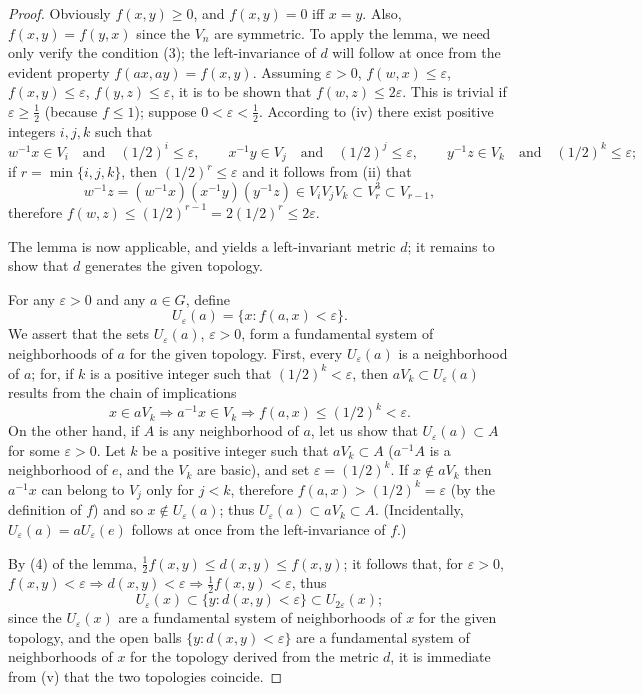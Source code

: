 \begin{proof}
    Obviously $f(x,y) \ge 0$, and $f(x,y) = 0$ iff $x = y$. Also, $f(x,y) = f(y,x)$ since the $V_n$ are symmetric. To apply the lemma, we need only verify the condition (3); the left-invariance of $d$ will follow at once from the evident property $f(ax,ay) = f(x,y)$. Assuming $\varepsilon > 0$, $f(w,x) \le \varepsilon$, $f(x,y) \le \varepsilon$, $f(y,z) \le \varepsilon$, it is to be shown that $f(w,z) \le 2\varepsilon$. This is trivial if $\varepsilon \ge \tfrac{1}{2}$ (because $f \le 1$); suppose $0 < \varepsilon < \tfrac{1}{2}$. According to (iv) there exist positive integers $i,j,k$ such that
    \[
        w^{-1}x \in V_i \quad \text{and} \quad (1/2)^i \le \varepsilon, \qquad
        x^{-1}y \in V_j \quad \text{and} \quad (1/2)^j \le \varepsilon, \qquad
        y^{-1}z \in V_k \quad \text{and} \quad (1/2)^k \le \varepsilon;
    \]
    if $r = \min\{i,j,k\}$, then $(1/2)^r \le \varepsilon$ and it follows from (ii) that
    \[
        w^{-1}z = (w^{-1}x)(x^{-1}y)(y^{-1}z) \in V_i V_j V_k \subset V_r^3 \subset V_{r-1},
    \]
    therefore $f(w,z) \le (1/2)^{r-1} = 2(1/2)^r \le 2\varepsilon$.

    The lemma is now applicable, and yields a left-invariant metric $d$; it remains to show that $d$ generates the given topology.

    For any $\varepsilon > 0$ and any $a \in G$, define
    \[
        U_\varepsilon(a) = \{ x : f(a,x) < \varepsilon \}.
    \]
    We assert that the sets $U_\varepsilon(a)$, $\varepsilon > 0$, form a fundamental system of neighborhoods of $a$ for the given topology. First, every $U_\varepsilon(a)$ is a neighborhood of $a$; for, if $k$ is a positive integer such that $(1/2)^k < \varepsilon$, then $aV_k \subset U_\varepsilon(a)$ results from the chain of implications
    \[
        x \in aV_k \Rightarrow a^{-1}x \in V_k \Rightarrow f(a,x) \le (1/2)^k < \varepsilon.
    \]
    On the other hand, if $A$ is any neighborhood of $a$, let us show that $U_\varepsilon(a) \subset A$ for some $\varepsilon > 0$. Let $k$ be a positive integer such that $aV_k \subset A$ ($a^{-1}A$ is a neighborhood of $e$, and the $V_k$ are basic), and set $\varepsilon = (1/2)^k$. If $x \notin aV_k$ then $a^{-1}x$ can belong to $V_j$ only for $j < k$, therefore $f(a,x) > (1/2)^k = \varepsilon$ (by the definition of $f$) and so $x \notin U_\varepsilon(a)$; thus $U_\varepsilon(a) \subset aV_k \subset A$. (Incidentally, $U_\varepsilon(a) = aU_\varepsilon(e)$ follows at once from the left-invariance of $f$.)

    By (4) of the lemma, $\tfrac{1}{2}f(x,y) \le d(x,y) \le f(x,y)$; it follows that, for $\varepsilon > 0$, $f(x,y) < \varepsilon \Rightarrow d(x,y) < \varepsilon \Rightarrow \tfrac{1}{2}f(x,y) < \varepsilon$, thus
    \begin{equation}
        U_\varepsilon(x) \subset \{y : d(x,y) < \varepsilon\} \subset U_{2\varepsilon}(x);
    \end{equation}
    since the $U_\varepsilon(x)$ are a fundamental system of neighborhoods of $x$ for the given topology, and the open balls $\{y : d(x,y) < \varepsilon\}$ are a fundamental system of neighborhoods of $x$ for the topology derived from the metric $d$, it is immediate from (v) that the two topologies coincide.


\end{proof}
